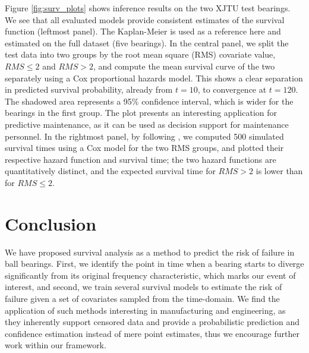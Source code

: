 \documentclass[letterpaper]{article} %
\begin{document}

Figure \ref{fig:surv_plots} shows inference results on the two XJTU test bearings. We see that all evaluated models provide consistent estimates of the survival function (leftmost panel). The Kaplan-Meier is used as a reference here and estimated on the full dataset (five bearings). In the central panel, we split the test data into two groups by the root mean square (RMS) covariate value, $RMS \leq 2$ and $RMS > 2$, and compute the mean survival curve of the two separately using a Cox proportional hazards model. This shows a clear separation in predicted survival probability, already from $t=10$, to convergence at $t=120$. The shadowed area represents a 95\% confidence interval, which is wider for the bearings in the first group. The plot presents an interesting application for predictive maintenance, as it can be used as decision support for maintenance personnel. In the rightmost panel, by following \cite{austin_generating_2012}, we computed 500 simulated survival times using a Cox model for the two RMS groups, and plotted their respective hazard function and survival time; the two hazard functions are quantitatively distinct, and the expected survival time for $RMS > 2$ is lower than for $RMS \leq 2$.

\section{Conclusion}

We have proposed survival analysis as a method to predict the risk of failure in ball bearings. First, we identify the point in time when a bearing starts to diverge significantly from its original frequency characteristic, which marks our event of interest, and second, we train several survival models to estimate the risk of failure given a set of covariates sampled from the time-domain. We find the application of such methods interesting in manufacturing and engineering, as they inherently support censored data and provide a probabilistic prediction and confidence estimation instead of mere point estimates, thus we encourage further work within our framework.
\end{document}
